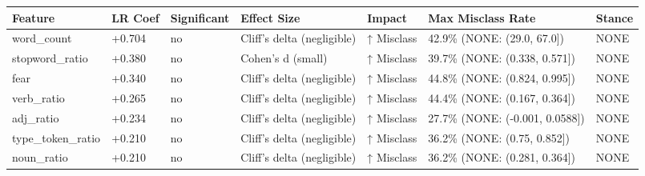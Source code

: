 \begin{tabular}{lllllll}
\toprule
Feature & LR Coef & Significant & Effect Size & Impact & Max Misclass Rate & Stance \\
\midrule
word\_count & +0.704 & no & Cliff's delta (negligible) & ↑ Misclass & 42.9\% (NONE: (29.0, 67.0]) & NONE \\
stopword\_ratio & +0.380 & no & Cohen's d (small) & ↑ Misclass & 39.7\% (NONE: (0.338, 0.571]) & NONE \\
fear & +0.340 & no & Cliff's delta (negligible) & ↑ Misclass & 44.8\% (NONE: (0.824, 0.995]) & NONE \\
verb\_ratio & +0.265 & no & Cliff's delta (negligible) & ↑ Misclass & 44.4\% (NONE: (0.167, 0.364]) & NONE \\
adj\_ratio & +0.234 & no & Cliff's delta (negligible) & ↑ Misclass & 27.7\% (NONE: (-0.001, 0.0588]) & NONE \\
type\_token\_ratio & +0.210 & no & Cliff's delta (negligible) & ↑ Misclass & 36.2\% (NONE: (0.75, 0.852]) & NONE \\
noun\_ratio & +0.210 & no & Cliff's delta (negligible) & ↑ Misclass & 36.2\% (NONE: (0.281, 0.364]) & NONE \\
\bottomrule
\end{tabular}
